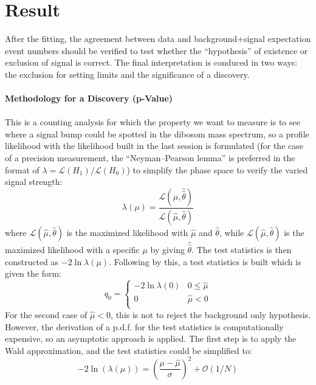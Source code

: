 \section{Result}
After the fitting, the agreement between data and background+signal expectation event numbers should be verified to test whether the ``hypothesis'' of existence or exclusion of signal is correct. The final interpretation is conduced in two ways: the exclusion for setting limits and the significance of a discovery. 
\\
\\{\bf Methodology for a Discovery (p-Value)}
\\
\\This is a counting analysis for which the property we want to measure is to see where a signal bump could be spotted in the dibosom mass spectrum, so a profile likelihood with the likelihood built in the last session is formulated\cite{profile1,profile2} (for the case of a precision measurement, the ``Neyman–Pearson lemma'' is preferred in the format of $\lambda=\mathcal{L}(H_{1})/\mathcal{L}(H_0)$\cite{pn}) to simplify the phase space to verify the varied signal strength:
\begin{equation}
\lambda(\mu) = \frac{\mathcal{L}(\mu,\hat{\hat{\theta}})}{\mathcal{L}(\hat{\mu},\hat{\theta})}
\end{equation}
where $\mathcal{L}(\hat{\mu},\hat{\theta})$ is the maximized likelihood with $\hat{\mu}$ and $\hat{\theta}$, while $\mathcal{L}(\hat{\mu},\hat{\theta})$ is the maximized likelihood with a specific $\mu$ by giving $\hat{\hat{\theta}}$. The test statistics is then constructed as $-2\ln{\lambda(\mu)}$. Following by this, a test statistics\cite{teststats} is built which is given the form:
\begin{equation}
\label{Eq:testPvalue}
q_{0} = 
\begin{cases}
-2 \ln \lambda(0) & 0 \le \hat{\mu} \\
0 & \hat{\mu} < 0 \\
\end{cases}
\end{equation}
\noindent
For the second case of $\hat{\mu}<0$, this is not to reject the background only hypothesis. However, the derivation of a p.d.f. for the test statistics is computationally expensive, so an asymptotic approach is applied. The first step is to apply the Wald approximation, and the test statistics could be simplified to:
\begin{equation}
\label{Eq:Wald_thr}
-2\ln(\lambda(\mu))=(\frac{\mu-\hat{\mu}}{\sigma})^2+\mathcal{O}(1/N)
\end{equation}
